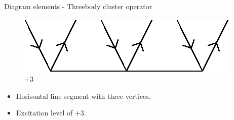 \begin{frame}{Diagram elements - Threebody cluster operator}

    \renewcommand{\figurename}{Level}

    \begin{figure}
    \centering
    \parbox{0.20\textwidth}{
            \centering
            \includegraphics[scale=0.65]{graphics/t3}
            \caption{+3}
        }
    \end{figure}

    \begin{itemize}
        \item Horisontal line segment with three vertices.
        \item Excitation level of +3.
    \end{itemize}
\end{frame}

    

